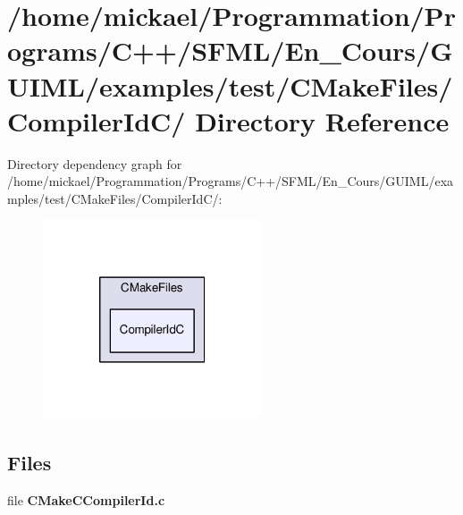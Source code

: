 \section{/home/mickael/\-Programmation/\-Programs/\-C++/\-S\-F\-M\-L/\-En\-\_\-\-Cours/\-G\-U\-I\-M\-L/examples/test/\-C\-Make\-Files/\-Compiler\-Id\-C/ Directory Reference}
\label{dir_c7101d98adae4696174b049b157a5404}
Directory dependency graph for /home/mickael/\-Programmation/\-Programs/\-C++/\-S\-F\-M\-L/\-En\-\_\-\-Cours/\-G\-U\-I\-M\-L/examples/test/\-C\-Make\-Files/\-Compiler\-Id\-C/\-:\nopagebreak
\begin{figure}[H]
\begin{center}
\leavevmode
\includegraphics[width=184pt]{dir_c7101d98adae4696174b049b157a5404_dep}
\end{center}
\end{figure}
\subsection*{Files}
\begin{DoxyCompactItemize}
\item 
file {\bfseries C\-Make\-C\-Compiler\-Id.\-c}
\end{DoxyCompactItemize}
